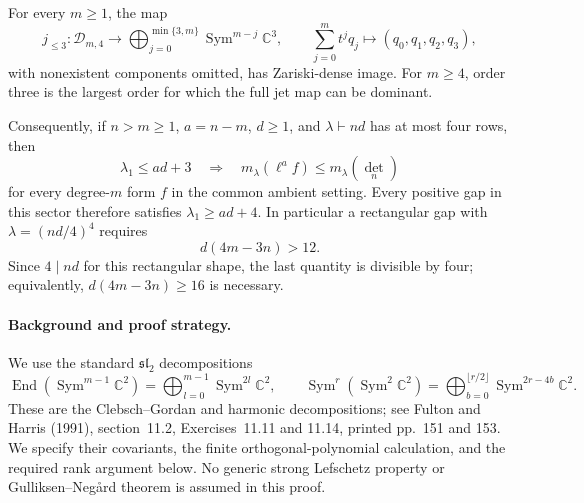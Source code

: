 \begin{proposition}\label{G-15}
For every $m\geq1$, the map
\[
 j_{\leq3}:\mathcal D_{m,4}\longrightarrow
   \bigoplus_{j=0}^{\min\{3,m\}}
          \operatorname{Sym}^{m-j}\mathbb C^3,
 \qquad \sum_{j=0}^m t^j q_j\longmapsto(q_0,q_1,q_2,q_3),
\]
with nonexistent components omitted, has Zariski-dense image.
For $m\geq4$, order three is the largest order for which the
full jet map can be dominant.

Consequently, if $n>m\geq1$, $a=n-m$, $d\geq1$, and
$\lambda\vdash nd$ has at most four rows, then
\[
 \lambda_1\leq ad+3
 \quad\Longrightarrow\quad
 m_\lambda(\ell^a f)\leq m_\lambda(\det_n)
\]
for every degree-$m$ form $f$ in the common ambient setting.
Every positive gap in this sector therefore satisfies
$\lambda_1\geq ad+4$. In particular a rectangular gap
with $\lambda=(nd/4)^4$ requires
\[
 d(4m-3n)>12.
\]
Since $4\mid nd$ for this rectangular shape, the last
quantity is divisible by four; equivalently,
$d(4m-3n)\geq16$ is necessary.
\end{proposition}

\paragraph{Background and proof strategy.}
We use the standard $\mathfrak{sl}_2$ decompositions
\[
 \operatorname{End}(\operatorname{Sym}^{m-1}\mathbb C^2)
       =\bigoplus_{l=0}^{m-1}\operatorname{Sym}^{2l}\mathbb C^2,
 \qquad
 \operatorname{Sym}^{r}(\operatorname{Sym}^2\mathbb C^2)
       =\bigoplus_{b=0}^{\lfloor r/2\rfloor}
             \operatorname{Sym}^{2r-4b}\mathbb C^2.
\]
These are the Clebsch--Gordan and harmonic decompositions;
see Fulton and Harris (1991), section~11.2, Exercises~11.11
and 11.14, printed pp.~151 and 153. We specify their
covariants, the finite orthogonal-polynomial calculation,
and the required rank argument below. No generic strong
Lefschetz property or Gulliksen--Neg\aa rd theorem is
assumed in this proof.

